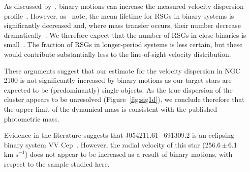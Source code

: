 \documentclass[useAMS,usenatbib]{mn2e}
\def\kms{$\mbox{km s}^{-1}$}
\begin{document}
As discussed by~\citet{2010MNRAS.402.1750G}, binary motions can increase the measured velocity dispersion profile~\citep[e.g. see][]{2012A&A...546A..73H}.
However, as~\citet{2010MNRAS.402.1750G} note, the mean lifetime for RSGs in binary systems is significantly decreased and, where mass transfer occurs, their number decrease dramatically~\citep{2008MNRAS.384.1109E}.
We therefore expect that the number of RSGs in close binaries is small~\citep{1979MNRAS.186..831F,2009ApJ...696.2014D}.
The fraction of RSGs in longer-period systems is less certain, but these would contribute substantially less to the line-of-sight velocity distribution.

These arguments suggest that our estimate for the velocity dispersion in NGC\,2100 is not significantly increased by binary motions as our target stars are expected to be (predominantly) single objects. As the true dispersion of the cluster appears to be unresolved (Figure~\ref{fig:sig1d}), we conclude therefore that the upper limit of the dynamical mass is consistent with the published photometric mass.

Evidence in the literature suggests that J054211.61$-$691309.2 is an eclipsing binary system VV Cep~\citep{1979MNRAS.186..831F}.
However, the radial velocity of this star (256.6\,$\pm$\,6.1\,\kms) does not appear to be increased as a result of binary motions, with respect to the sample studied here.

\end{document}
